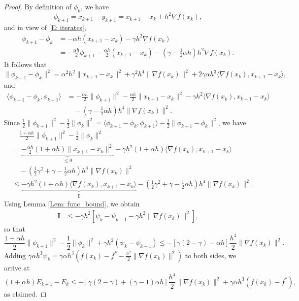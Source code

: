 \documentclass[10pt,a4paper]{amsart}
\begin{document}
\begin{proof}
By definition of $\phi_k$, we have
$$ \phi_{k+1} = x_{k+1}-y_{k+1} = x_{k+1}-x_k + h^2 \nabla f(x_k), $$
and in view of \eqref{E: iterates},
\begin{align*}
\phi_{k+1} - \phi_k
&= -\alpha h ( x_{k+1} - x_k ) - \gamma h^2 \nabla f(x_k) \\
&= - \frac{\alpha h}{2}\phi_{k+1} 
   - \frac{\alpha h}{2}( x_{k+1} - x_k )
   - \left(\gamma - \frac{1}{2}\alpha h \right) h^2 \nabla f(x_k).
\end{align*}
It follows that
$$ \| \phi_{k+1} - \phi_k \|^2
= \alpha^2 h^2 \| x_{k+1} - x_k \|^2
  + \gamma^2 h^4 \| \nabla f(x_k) \|^2
  + 2\gamma\alpha h^3 \langle \nabla f(x_k), x_{k+1}-x_k \rangle, $$
and
\begin{align*}
\langle \phi_{k+1}-\phi_k, \phi_{k+1} \rangle
&= -\frac{\alpha h}{2}\| \phi_{k+1} \|^2
 - \frac{\alpha h}{2}\| x_{k+1}-x_k \|^2
 - \gamma h^2 \langle \nabla f(x_k), x_{k+1}-x_k \rangle \\
&\quad - \left( \gamma - \frac{1}{2}\alpha h \right) h^4 \| \nabla f(x_k) \|^2.
\end{align*}
Since $\frac{1}{2}\| \phi_{k+1} \|^2 - \frac{1}{2}\| \phi_k \|^2 = \langle \phi_{k+1}-\phi_k, \phi_{k+1} \rangle - \frac{1}{2}\| \phi_{k+1} - \phi_k \|^2$, we have
\begin{align*}
&\quad \frac{1+\alpha h}{2}\| \phi_{k+1} \|^2 - \frac{1}{2}\| \phi_k \|^2 \\
&= \underbrace{ - \frac{\alpha h}{2}(1+\alpha h)\| x_{k+1} - x_k \|^2 }_{\le 0}
   - \gamma h^2 (1+\alpha h) \langle \nabla f(x_k), x_{k+1}-x_k \rangle \\
&\quad - \left( \frac{1}{2}\gamma^2 + \gamma - \frac{1}{2}\alpha h \right) h^4 \| \nabla f(x_k) \|^2 \\
&\le \underbrace{ - \gamma h^2 (1+\alpha h) \langle \nabla f(x_k), x_{k+1}-x_k \rangle }_{\mathbf{I}}
    - \left( \frac{1}{2}\gamma^2 + \gamma - \frac{1}{2}\alpha h \right) h^4 \| \nabla f(x_k) \|^2.  
\end{align*}
Using Lemma \ref{Lem: func_bound}, we obtain
\begin{align*}
\mathbf{I}
&\le -\gamma h^2 \left[ \psi_k - \psi_{k-1} - \gamma h^2 \| \nabla f(x_k) \|^2 \right],
\end{align*}
so that
$$\frac{1+\alpha h}{2}\| \phi_{k+1} \|^2 - \frac{1}{2}\| \phi_k \|^2 
   + \gamma h^2 (\psi_k - \psi_{k-1}) 
\le - \left[ \gamma(2-\gamma) - \alpha h \right] \frac{h^4}{2} \| \nabla f(x_k) \|^2. $$
Adding $\gamma\alpha h^3 \psi_k = \gamma\alpha h^3\left( f(x_k) - f^* - \frac{h^2}{2}\| \nabla f(x_k) \|^2 \right)$ to both sides, we arrive at
$$ (1+\alpha h)E_{k+1}-E_k 
\le - \left[ \gamma(2-\gamma) + (\gamma-1) \alpha h \right] \frac{h^4}{2} \| \nabla f(x_k) \|^2
    + \gamma\alpha h^3 \left( f(x_k) - f^* \right), $$
as claimed.
\end{proof}
\end{document}

